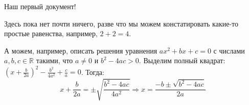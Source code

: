 Наш первый документ!

Здесь пока нет почти ничего, разве что мы можем констатировать какие-то простые равенства, например, $2 + 2 = 4$.

А можем, например, описать решения уравнения $ax^2 + bx + c = 0$ с числами $a, b, c \in \mathbb{R}$ такими, что $a \ne 0$ и $b^2 - 4ac > 0$. Выделим полный квадрат: $(x + \frac{b}{2a})^2 - \frac{b^2}{4a^2} + \frac{c}{a} = 0$. Тогда:
\[x+\frac{b}{2a} = \pm \sqrt{\frac{b^2 - 4ac}{4a^2}} \Rightarrow x = \frac{-b \pm \sqrt{b^2 - 4ac}}{2a}\]